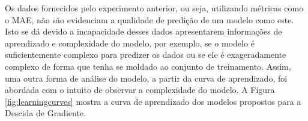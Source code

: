 \documentclass[conference]{IEEEtran}
\begin{document}
Os dados fornecidos pelo experimento anterior, ou seja, utilizando métricas como o MAE, não são evidenciam a qualidade de predição de um modelo como este. Isto se dá devido a incapacidade desses dados apresentarem informações de aprendizado e complexidade do modelo, por exemplo, se o modelo é suficientemente complexo para predizer os dados ou se ele é exageradamente complexo de forma que tenha se moldado ao conjunto de treinamento. Assim, uma outra forma de análise do modelo, a partir da curva de aprendizado, foi abordada com o intuito de observar a complexidade do modelo. A Figura \ref{fig:learningcurves} mostra a curva de aprendizado dos modelos propostos para a Descida de Gradiente.

\begin{figure}[!h]
	\centering
	\quad
\end{figure}
\end{document}

